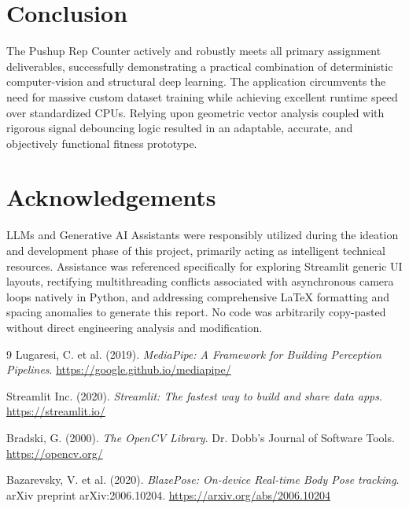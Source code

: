 \documentclass[12pt, a4paper]{article}
\begin{document}
\section{Conclusion}
The Pushup Rep Counter actively and robustly meets all primary assignment deliverables, successfully demonstrating a practical combination of deterministic computer-vision and structural deep learning. The application circumvents the need for massive custom dataset training while achieving excellent runtime speed over standardized CPUs. Relying upon geometric vector analysis coupled with rigorous signal debouncing logic resulted in an adaptable, accurate, and objectively functional fitness prototype.


\section{Acknowledgements}
LLMs and Generative AI Assistants were responsibly utilized during the ideation and development phase of this project, primarily acting as intelligent technical resources. Assistance was referenced specifically for exploring Streamlit generic UI layouts, rectifying multithreading conflicts associated with asynchronous camera loops natively in Python, and addressing comprehensive LaTeX formatting and spacing anomalies to generate this report. No code was arbitrarily copy-pasted without direct engineering analysis and modification.

\begin{thebibliography}{9}
Lugaresi, C. et al. (2019). \textit{MediaPipe: A Framework for Building Perception Pipelines}. \url{https://google.github.io/mediapipe/}

Streamlit Inc. (2020). \textit{Streamlit: The fastest way to build and share data apps}. \url{https://streamlit.io/}

Bradski, G. (2000). \textit{The OpenCV Library}. Dr. Dobb's Journal of Software Tools. \url{https://opencv.org/}

Bazarevsky, V. et al. (2020). \textit{BlazePose: On-device Real-time Body Pose tracking}. arXiv preprint arXiv:2006.10204. \url{https://arxiv.org/abs/2006.10204}
\end{thebibliography}
\end{document}
